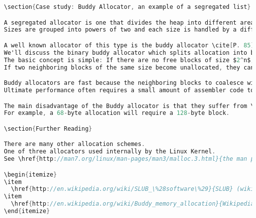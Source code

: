 \begin{lstlisting}[language=C]
\section{Case study: Buddy Allocator, an example of a segregated list}

A segregated allocator is one that divides the heap into different areas that are handled by different sub-allocators dependent on the size of the allocation request.
Sizes are grouped into powers of two and each size is handled by a different sub-allocator and each size maintains its own free list.

A well known allocator of this type is the buddy allocator \cite[P. 85]{rangan1999foundations}.
We'll discuss the binary buddy allocator which splits allocation into blocks of size $2^n; n = 1, 2, 3, ...$ times some base unit number of bytes, but others also exist like Fibonacci split where the allocation is rounded up to the next fibonacci number.
The basic concept is simple: If there are no free blocks of size $2^n$, go to the next level and steal that block and split it into two.
If two neighboring blocks of the same size become unallocated, they can be coalesced back together into a single large block of twice the size.

Buddy allocators are fast because the neighboring blocks to coalesce with can be calculated from the free'd block's address, rather than traversing the size tags.
Ultimate performance often requires a small amount of assembler code to use a specialized CPU instruction to find the lowest non-zero bit.

The main disadvantage of the Buddy allocator is that they suffer from \emph{internal fragmentation}, because allocations are rounded up to the nearest block size.
For example, a 68-byte allocation will require a 128-byte block.

\section{Further Reading}

There are many other allocation schemes.
One of three allocators used internally by the Linux Kernel.
See \href{http://man7.org/linux/man-pages/man3/malloc.3.html}{the man page}!

\begin{itemize}
\item
  \href{http://en.wikipedia.org/wiki/SLUB_\%28software\%29}{SLUB} (wikipedia)
\item
  \href{http://en.wikipedia.org/wiki/Buddy_memory_allocation}{Wikipedia's buddy memory allocation page}
\end{itemize}


\end{lstlisting}

